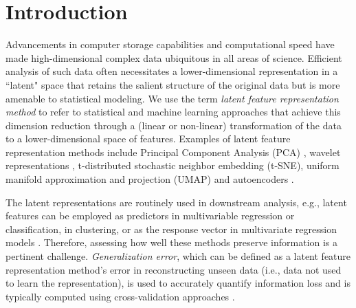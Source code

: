 \section{Introduction}

Advancements in computer storage capabilities and computational speed have made high-dimensional complex data ubiquitous in all areas of science.
Efficient analysis of such data often necessitates a lower-dimensional representation in a ``latent" space that retains the salient structure of the original data but is more amenable to statistical modeling.
We use the term \emph{latent feature representation method} to refer to statistical and machine learning approaches that achieve this dimension reduction through a (linear or non-linear) transformation of the data to a lower-dimensional space of features.
Examples of latent feature representation methods include Principal Component Analysis (PCA) \parencite{hotelling_analysis_1933}, wavelet representations \parencite{daubechies_wavelet_1990}, t-distributed stochastic neighbor embedding (t-SNE), uniform manifold approximation \parencite{maaten_visualizing_2008} and projection (UMAP) \parencite{mcinnes_umap_2020} and autoencoders \parencite{rumelhart_learning_1986}.

The latent representations are routinely used in downstream analysis, e.g., latent features can be employed as predictors in multivariable regression or classification, in clustering, or as the response vector in multivariate regression models \parencite{niu_dimensionality_2011,wang_role_2014,cook_fisher_2007}. 
Therefore, assessing how well these methods preserve information is a pertinent challenge.
\emph{Generalization error}, which can be defined as a latent feature representation method's error in reconstructing unseen data (i.e., data not used to learn the representation), is used to accurately quantify information loss and is typically computed using cross-validation approaches \parencite[see, e.g.,][]{becht_dimensionality_2019, wold_cross-validatory_1978, eastment_cross-validatory_1982,krzanowski_cross-validation_1987, minka_automatic_2000, rajan_bayesian_1994, camacho_cross-validation_2014, diana_cross-validation_2002, hubert_fast_2007, josse_selecting_2012, saccenti_use_2015}.

